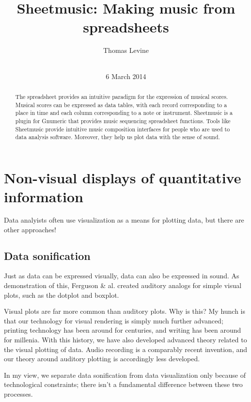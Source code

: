 \documentclass{acm_proc_article-sp}
\begin{document}
\title{Sheetmusic: Making music from spreadsheets}
\author{
\alignauthor
Thomas Levine\\
       \\
}
\date{6 March 2014}
\maketitle
\begin{abstract}
The spreadsheet provides an intuitive paradigm for the expression of musical
scores. Musical scores can be expressed as data tables, with each record
corresponding to a place in time and each column corresponding to a note
or instrument. Sheetmusic is a plugin for Gnumeric that provides music
sequencing spreadsheet functions. Tools like Sheetmusic provide intuitive
music composition interfaces for people who are used to data analysis software.
Moreover, they help us plot data with the sense of sound.
\end{abstract}
\section{Non-visual displays of quantitative information}
Data analyists often use visualization as a means for plotting data,
but there are other approaches!

\subsection{Data sonification}
Just as data can be expressed visually, data can also be expressed
in sound. As demonstration of this, Ferguson \& al. \cite{ferguson}
created auditory analogs for simple
visual plots, such as the dotplot and boxplot.

Visual plots are far more common than auditory plots. Why is this?
My hunch is that our technology for visual rendering is simply much
further advanced; printing technology has been around for centuries,
and writing has been around for millenia. With this history, we have
also developed advanced theory related to the visual plotting of data.
Audio recording is a comparably recent invention, and our theory around
auditory plotting is accordingly less developed.

In my view, we separate data sonification from data visualization
only because of technological constraints; there isn't a fundamental
difference between these two processes.
\end{document}
